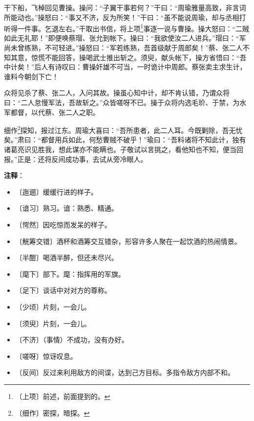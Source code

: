 \documentclass[12pt,UTF-8,openany]{ctexbook}
\begin{document}
\begin{normalsize}
    干下船，飞棹回见曹操。操问：“子翼干事若何？”干曰：“周瑜雅量高致，非言词所能动也。”操怒曰：“事又不济，反为所笑！”干曰：“虽不能说周瑜，却与丞相打听得一件事。乞退左右。”干取出书信，将上项\footnote{〔上项〕前述，前面提到的。}事逐一说与曹操。操大怒曰：“二贼如此无礼耶！”即便唤蔡瑁、张允到帐下。操曰：“我欲使汝二人进兵。”瑁曰：“军尚未曾练熟，不可轻进。”操怒曰：“军若练熟，吾首级献于周郎矣！”蔡、张二人不知其意，惊慌不能回答，操喝武士推出斩之。须臾，献头帐下，操方省悟曰：“吾中计矣！”后人有诗叹曰：曹操奸雄不可当，一时诡计中周郎。蔡张卖主求生计，谁料今朝剑下亡！
    
    众将见杀了蔡、张二人，入问其故。操虽心知中计，却不肯认错，乃谓众将曰：“二人怠慢军法，吾故斩之。”众皆嗟呀不已。操于众将内选毛玠、于禁，为水军都督，以代蔡、张二人之职。
    
    细作\footnote{〔细作〕密探，暗探。}探知，报过江东。周瑜大喜曰：“吾所患者，此二人耳。今既剿除，吾无忧矣。”肃曰：“都督用兵如此，何愁曹贼不破乎！”瑜曰：“吾料诸将不知此计，独有诸葛亮识见胜我，想此谋亦不能瞒也。子敬试以言挑之，看他知也不知，便当回报。”正是：还将反间成功事，去试从旁冷眼人。
    
\end{normalsize}


\newpage

\textbf{注释}：

\vspace{-1em}

\begin{itemize}
    \setlength\itemsep{-0.2em}
    \item 〔迤逦〕缓缓行进的样子。
    \item 〔谙习〕熟习。谙：熟悉、精通。
    \item 〔愕然〕因吃惊而发呆的样子。
    \item 〔觥筹交错〕酒杯和酒筹交互错杂，形容许多人聚在一起饮酒的热闹情景。
    \item 〔半酣〕喝酒半醉，但还未尽兴。
    \item 〔麾下〕部下。麾：指挥用的军旗。
    \item 〔足下〕谈话中对对方的尊称。
    \item 〔少顷〕片刻，一会儿。
    \item 〔须臾〕片刻，一会儿。
    \item 〔不济〕（事情）不成功，没有办好。
    \item 〔嗟呀〕惊讶叹息。
    \item 〔反间〕反过来利用敌方的间谍，达到己方目标。多指令敌方内部不和。
\end{itemize}
\end{document}
